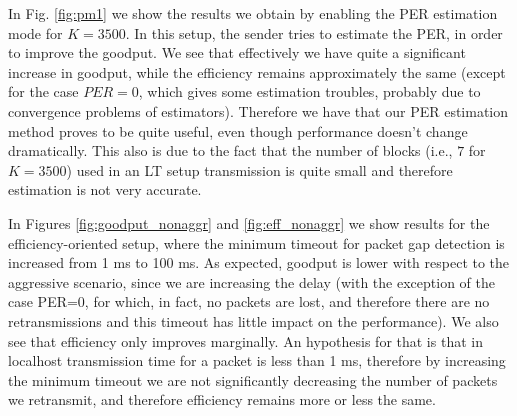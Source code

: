 In Fig. \ref{fig:pm1} we show the results we obtain by enabling the PER estimation mode for $K=3500$. In this setup, the sender tries to estimate the PER, in order to improve the goodput. We see that effectively we have quite a significant increase in goodput, while the efficiency remains approximately the same (except for the case $PER=0$, which gives some estimation troubles, probably due to convergence problems of estimators). Therefore we have that our PER estimation method proves to be quite useful, even though performance doesn't change dramatically. This also is due to the fact that the number of blocks (i.e., $7$ for $K=3500$) used in an LT setup transmission is quite small and therefore estimation is not very accurate.


In Figures \ref{fig:goodput_nonaggr} and  \ref{fig:eff_nonaggr} we show results for the efficiency-oriented setup, where the minimum timeout for packet gap detection is increased from 1 ms to 100 ms. As expected, goodput is lower with respect to the aggressive scenario, since we are increasing the delay (with the exception of the case PER=0, for which, in fact, no packets are lost, and therefore there are no retransmissions and this timeout has little impact on the performance). We also see that efficiency only improves marginally. An hypothesis for that is that in localhost transmission time for a packet is less than 1 ms, therefore by increasing the minimum timeout we are not significantly decreasing the number of packets we retransmit, and therefore efficiency remains more or less the same. 

